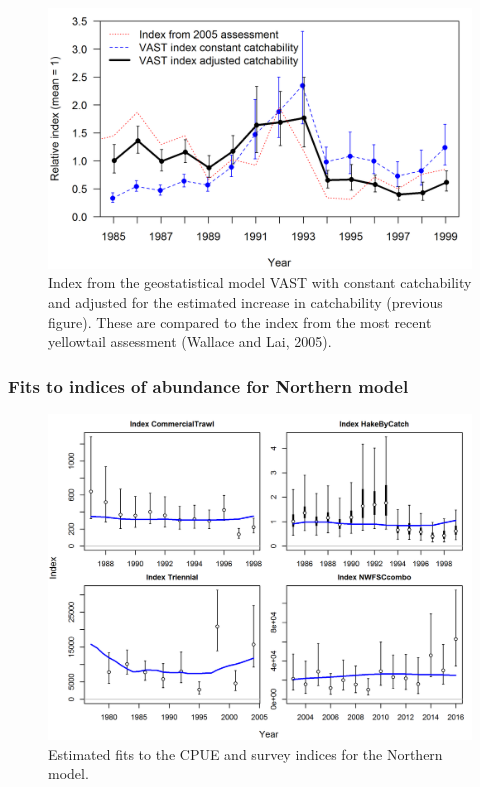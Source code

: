 \documentclass[12pt,]{article}
\begin{document}
\begin{figure}[htbp]
\centering
\includegraphics{Figures/ASHOP_index_illustration.png}
\caption{Index from the geostatistical model VAST with constant
catchability and adjusted for the estimated increase in catchability
(previous figure). These are compared to the index from the most recent
yellowtail assessment (Wallace and Lai, 2005).\label{fig:ASHOP_X4}}
\end{figure}

\FloatBarrier

\newpage

\subsubsection{Fits to indices of abundance for Northern
model}\label{fits-to-indices-of-abundance-for-northern-model}

\begin{figure}[htbp]
\centering
\includegraphics{r4ss/plots_mod1/index0_all_indices_fit.png}
\caption{Estimated fits to the CPUE and survey indices for the Northern
model. \label{fig:index_fits1}}
\end{figure}
\end{document}
